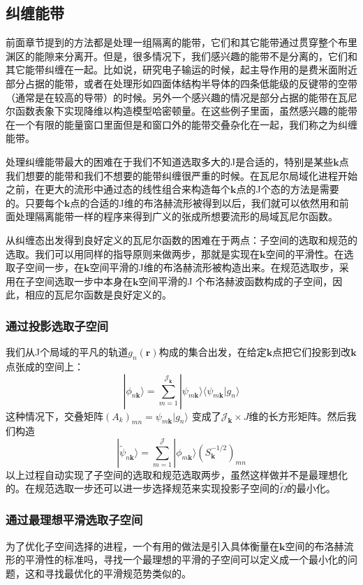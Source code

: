\subsection{纠缠能带}
前面章节提到的方法都是处理一组隔离的能带，它们和其它能带通过贯穿整个布里渊区的能隙来分离开。但是，很多情况下，我们感兴趣的能带不是分离的，它们和其它能带纠缠在一起。比如说，研究电子输运的时候，起主导作用的是费米面附近部分占据的能带，或者在处理形如四面体结构半导体的四条低能级的反键带的空带（通常是在较高的导带）的时候。另外一个感兴趣的情况是部分占据的能带在瓦尼尔函数表象下实现降维以构造模型哈密顿量。在这些例子里面，虽然感兴趣的能带在一个有限的能量窗口里面但是和窗口外的能带交叠杂化在一起，我们称之为纠缠能带。

处理纠缠能带最大的困难在于我们不知道选取多大的J是合适的，特别是某些$\bm{k}$点我们想要的能带和我们不想要的能带纠缠很严重的时候。在瓦尼尔局域化进程开始之前，在更大的流形中通过态的线性组合来构造每个$\bm{k}$点的J个态的方法是需要的。只要每个$\bm{k}$点的合适的J维的布洛赫流形被得到以后，我们就可以依然用和前面处理隔离能带一样的程序来得到广义的张成所想要流形的局域瓦尼尔函数。

从纠缠态出发得到良好定义的瓦尼尔函数的困难在于两点：子空间的选取和规范的选取。我们可以用同样的指导原则来做两步，那就是实现在$\bm{k}$空间的平滑性。在选取子空间一步，在$\bm{k}$空间平滑的J维的布洛赫流形被构造出来。在规范选取步，采用在子空间选取一步中本身在$\bm{k}$空间平滑的J 个布洛赫波函数构成的子空间，因此，相应的瓦尼尔函数是良好定义的。

\subsubsection{通过投影选取子空间}
我们从J个局域的平凡的轨道$g_n(\bm{r})$构成的集合出发，在给定$\bm{k}$点把它们投影到改$\bm{k}$点张成的空间上：
\begin{equation}
|\phi_{n\bm{k}} \rangle=\sum_{m=1}^{\mathcal{J}_{\bm{k}}}|\psi_{m\bm{k}} \rangle \langle\psi_{m\bm{k}}|g_n \rangle
\end{equation}
这种情况下，交叠矩阵$(A_k)_{mn}=\psi_{m\bm{k}}|g_n \rangle$ 变成了$\mathcal{J}_{\bm{k}} \times J $维的长方形矩阵。然后我们构造
\begin{equation}
|\widetilde\psi_{n\bm{k}}\rangle=\sum_{m=1}^{\mathcal{J}}|\phi_{m\bm{k}} \rangle(S^{-1/2}_{\bm{k}})_{mn}
\end{equation}
以上过程自动实现了子空间的选取和规范选取两步，虽然这样做并不是最理想化的。在规范选取一步还可以进一步选择规范来实现投影子空间的$\widetilde \Omega$的最小化。

\subsubsection{通过最理想平滑选取子空间}
为了优化子空间选择的进程，一个有用的做法是引入具体衡量在$\bm{k}$空间的布洛赫流形的平滑性的标准吗，寻找一个最理想的平滑的子空间可以定义成一个最小化的问题，这和寻找最优化的平滑规范势类似的。

